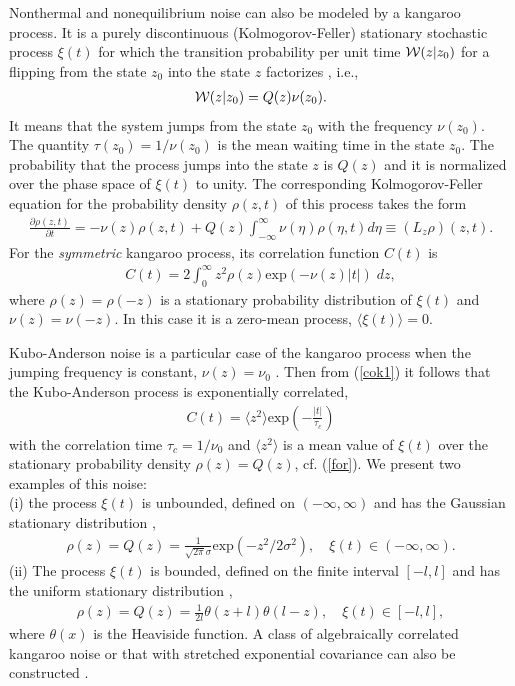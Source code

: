\documentclass[authoryear,draft,1p,times]{elsarticle}
\renewcommand{\=}{\stackrel{\mathrm{d}}{=}}
\begin{document}
Nonthermal and nonequilibrium noise can also be modeled by
a kangaroo process.  It is a purely
discontinuous (Kolmogorov-Feller)
stationary stochastic process $\xi(t) $ for which the transition
probability per unit time ${\cal W}(z \vert z_0)$ for a flipping
from the  state
$z_0$ into the state $z$ factorizes \cite{kam}, i.e.,
%
\begin{eqnarray}  \label{fac}
{\cal W}(z \vert z_0) = Q(z) \nu (z_0).
\end{eqnarray}
%
It means that the system jumps from the state $z_0$
with the frequency $\nu(z_0)$.
The quantity $\tau(z_0) = 1/\nu(z_0)$ is the mean waiting time in the state
$z_0$. The probability
that the process jumps into the state $z$ is $Q(z)$ and it is normalized
over the phase space of $\xi(t) $ to unity.
The corresponding Kolmogorov-Feller equation for the probability
density $\rho(z, t)$ of this process takes the form \cite{bri}
%
\begin{eqnarray}  \label{for}
{\frac{\partial \rho(z, t)}{\partial t}} = 
- \nu (z) \rho(z, t) + Q(z) \int_{-\infty}^{\infty} \nu (\eta) 
\rho(\eta, t) d\eta
\equiv (L_z \rho)(z,t).
\end{eqnarray}
%
For the {\it symmetric} kangaroo process,
its correlation function $C(t)$ is \cite{bri}
%
\begin{eqnarray}  \label{cok1}
C(t) =  2 \int_{0}^{\infty} z^2 \rho(z)
\mbox{exp}(-\nu(z)\vert t\vert) \;dz,
\end{eqnarray}
%
where $\rho(z) = \rho(-z)$ is a stationary probability
distribution of $\xi(t) $ and $\nu(z) = \nu(-z)$. In this case it is
a zero-mean process, $\langle \xi(t) \rangle = 0$.

Kubo-Anderson noise is a particular case of the kangaroo process
when the jumping frequency is constant, $\nu(z) = \nu_0$
\cite{bri}.
Then from (\ref{cok1}) it follows that the Kubo-Anderson process is
exponentially correlated,
%
\begin{eqnarray}  \label{cok2}
C(t) =  \langle z^2 \rangle 
\mbox{exp}\left(-\frac{\vert t\vert}{\tau_c}\right)
\end{eqnarray}
%
with the correlation time
$\tau_c = 1/\nu_0$ and $\langle z^2 \rangle$
is a mean value of $\xi(t) $ over the stationary probability density
$\rho(z) = Q(z)$, cf. (\ref{for}). We present two examples
of this noise: \\
(i) the process $\xi(t) $ is unbounded, defined on $(-\infty, \infty)$ and
has the Gaussian stationary distribution \cite{doe},
%
\begin{eqnarray}  \label{gaus}
\rho(z) = Q(z) = \frac{1}{\sqrt{2\pi} \sigma}
\mbox{exp}(-z^2/2\sigma^2), \quad   \xi(t)  \in (-\infty, \infty).
\end{eqnarray}
%
(ii) The process $\xi(t) $ is bounded, defined on the finite 
interval  $[-l, l]$ and
has the uniform stationary distribution \cite{kostur},
%
\begin{eqnarray}  \label{uni}
\rho(z) =  Q(z) = \frac{1}{2l}\theta(z+l)\theta(l-z),
\quad  \xi(t)  \in [-l, l], 
\end{eqnarray}
%
where $\theta(x)$ is the Heaviside function. 
A class of algebraically  correlated kangaroo noise  or that   
with  stretched exponential covariance can also be constructed 
 \cite{kostur,srok}. 
\end{document}

